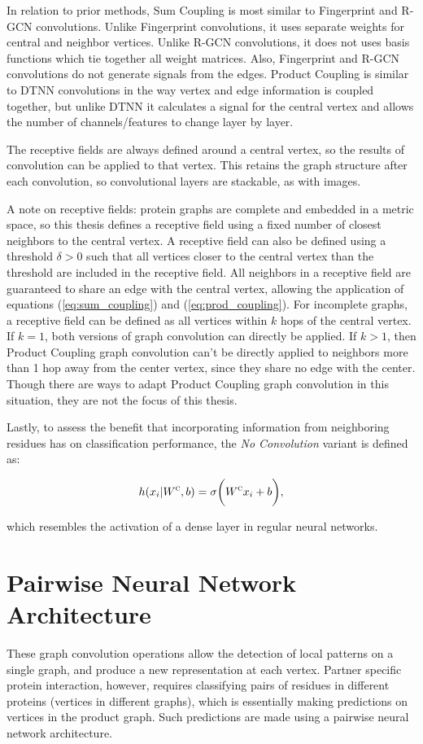 In relation to prior methods, Sum Coupling is most similar to Fingerprint and R-GCN convolutions.
Unlike Fingerprint convolutions, it uses separate weights for central and neighbor vertices.
Unlike R-GCN convolutions, it does not uses basis functions which tie together all weight matrices.
Also, Fingerprint and R-GCN convolutions do not generate signals from the edges.
Product Coupling is similar to DTNN convolutions in the way vertex and edge information is coupled together, but unlike DTNN it calculates a signal for the central vertex and allows the number of channels/features to change layer by layer. 

The receptive fields are always defined around a central vertex, so the results of convolution can be applied to that vertex.
This retains the graph structure after each convolution, so convolutional layers are stackable, as with images.

A note on receptive fields: protein graphs are complete and embedded in a metric space, so this thesis defines a receptive field using a fixed number of closest neighbors to the central vertex.
A receptive field can also be defined using a threshold $\delta>0$ such that all vertices closer to the central vertex than the threshold are included in the receptive field.
All neighbors in a receptive field are guaranteed to share an edge with the central vertex, allowing the application of equations (\ref{eq:sum_coupling}) and (\ref{eq:prod_coupling}).
For incomplete graphs, a receptive field can be defined as all vertices within $k$ hops of the central vertex. 
If $k=1$, both versions of graph convolution can directly be applied.
If $k>1$, then Product Coupling graph convolution can't be directly applied to neighbors more than 1 hop away from the center vertex, since they share no edge with the center. 
Though there are ways to adapt Product Coupling graph convolution in this situation, they are not the focus of this thesis.

Lastly, to assess the benefit that incorporating information from neighboring residues has on classification performance, the \emph{No Convolution} variant is defined as:

\begin{equation}
h(x_i | W^\textsc{c}, b)= \sigma \bigg( W^{\textsc{c}} x_i + b \bigg),
\label{eq:no_conv}
\end{equation}

\noindent
which resembles the activation of a dense layer in regular neural networks.


\section{Pairwise Neural Network Architecture}
These graph convolution operations allow the detection of local patterns on a single graph, and produce a new representation at each vertex.
Partner specific protein interaction, however, requires classifying pairs of residues in different proteins (vertices in different graphs), which is essentially making predictions on vertices in the product graph. 
Such predictions are made using a pairwise neural network architecture.

